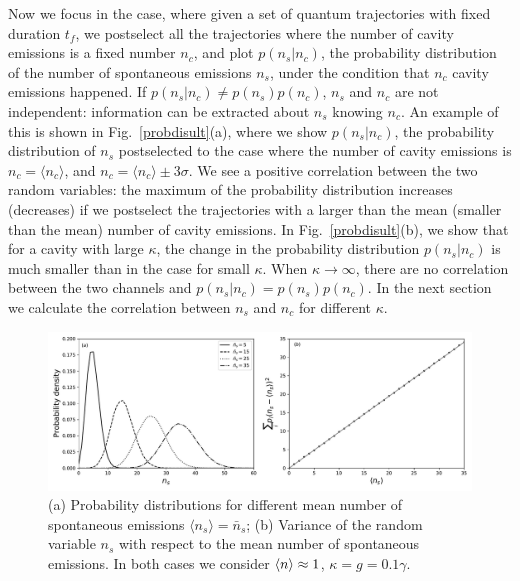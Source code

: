 \documentclass[epj,final]{svjour}
\begin{document}
Now we focus in the case, where given a set of quantum trajectories
with fixed duration $t_f$, we postselect all the trajectories where the
number of cavity emissions is a fixed number $n_c$, and plot
$p(n_s|n_c)$, the probability distribution of the number of spontaneous
emissions $n_s$, under the condition that $n_c$ cavity emissions
happened. If $p(n_s|n_c)\neq p(n_s)p(n_c)$, $n_s$ and $n_c$ are not
independent: information can be extracted about $n_s$ knowing $n_c$.
An example of this is shown in Fig.~\ref{probdisult}(a), where we
show $p(n_s|n_c)$, the probability distribution of $n_s$ postselected
to the case where the number of cavity emissions is
$n_c=\langle n_c \rangle$, and $n_c=\langle n_c \rangle\pm 3 \sigma$. We
see a positive correlation between the two random variables: the
maximum of the probability distribution increases (decreases) if we
postselect the trajectories with a larger than the mean (smaller than
the mean) number of cavity emissions. In Fig.~\ref{probdisult}(b), we
show that for a cavity with large $\kappa$, the change in the
probability distribution $p(n_s|n_c)$ is much smaller than in the case
for small $\kappa$. When
$\kappa\rightarrow\infty$, there are no correlation between the two
channels and $p(n_s|n_c)=p(n_s)p(n_c)$.
In the next section we calculate the correlation between $n_s$ and
$n_c$ for different $\kappa$.

\begin{center}
\begin{figure}[!t]
\includegraphics[scale = 0.5]{newerrorppp.pdf}
\caption{(a) Probability distributions for different mean number of
  spontaneous emissions $\langle n_s\rangle=\bar{n}_s$; (b)
  Variance of the random variable $n_s$ with respect to the mean number of
  spontaneous emissions. In both cases we consider
  $\expval{n} \approx 1$,  $\kappa = g = 0.1\gamma$.} \label{error2}
\end{figure}
\end{center}
\end{document}
